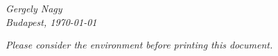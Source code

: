 \documentclass[12pt]{article}
\begin{document}
\vfill
\vfill
\vfill
\hfill\begin{minipage}[h]{0.3\textwidth}
\begin{center}
	\textit{Gergely Nagy}\\
	\textit{Budapest, \today}
\end{center}
\end{minipage}
\vfill

\newpage \tableofcontents

\vfill
\vfill
\begin{center}
\footnotesize\emph{Please consider the environment before printing this document.}
\end{center}
\vfill
\end{document}
